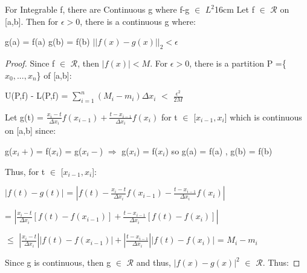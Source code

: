     \begin{wtheorem}{For Integrable f, there are Continuous g
    where f-g $\in$ $L^2$}{16cm}
        Let f $\in$ $\mathscr{R}$ on [a,b]. Then for $\epsilon > 0$, there is a
        continuous g where:
        
        \hspace{0.5cm}
        g(a) = f(a)
        \hspace{1cm}
        g(b) = f(b)
        \hspace{1cm}
        $||f(x)-g(x)||_2 < \epsilon$
    \end{wtheorem}

    \begin{proof}
        Since f $\in$ $\mathscr{R}$, then $|f(x)| < M$. For $\epsilon> 0$,
        there is a partition P =\{$x_0,...,x_n$\} of [a,b]:

        \hspace{0.5cm}
        U(P,f) - L(P,f)
        = $\sum_{i=1}^n (M_i - m_i)\Delta x_i$
        $<$ $\frac{\epsilon^2}{2M}$

        Let g(t) = $\frac{x_i-t}{\Delta x_i} f(x_{i-1})
                    + \frac{t-x_{i-1}}{\Delta x_i} f(x_i)$
        for t $\in$ [$x_{i-1},x_i$] which is continuous on [a,b] since:

        \hspace{0.5cm}
        g($x_i+$) = f($x_i$) = g($x_i-$)
        \hspace{1cm}
        $\Rightarrow$
        \hspace{1cm}
        g($x_i$) = f($x_i$)
        so g(a) = f(a) , g(b) = f(b)

        Thus, for t $\in$ [$x_{i-1},x_i$]:

        \hspace{0.5cm}
        $|f(t) - g(t)|$
        = $|f(t) - \frac{x_i-t}{\Delta x_i} f(x_{i-1})
            - \frac{t-x_{i-1}}{\Delta x_i} f(x_i)|$

        \hspace{0.5cm}
        = $|\frac{x_i-t}{\Delta x_i} [f(t) - f(x_{i-1})]
            + \frac{t-x_{i-1}}{\Delta x_i} [f(t) - f(x_i)]|$

        \hspace{0.5cm}
        $\leq$ $|\frac{x_i-t}{\Delta x_i}| |f(t) - f(x_{i-1})|
                + |\frac{t-x_{i-1}}{\Delta x_i}| |f(t) - f(x_i)|$
        = $M_i - m_i$

        Since g is continuous, then g $\in$ $\mathscr{R}$ and thus, $|f(x)-g(x)|^2$
        $\in$ $\mathscr{R}$. Thus:


\end{proof}
